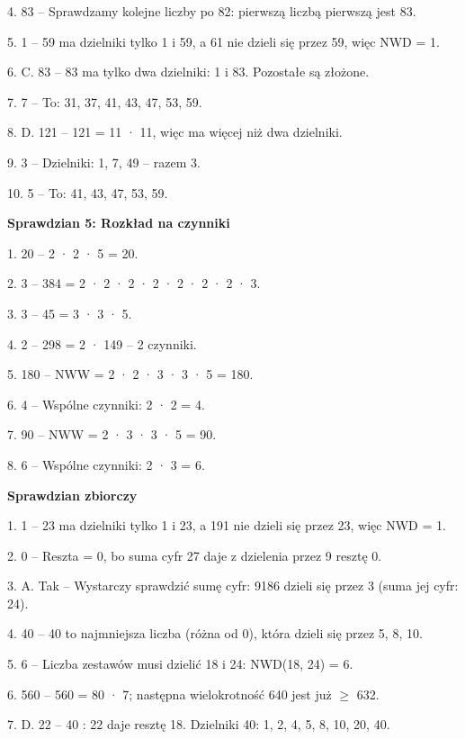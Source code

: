 4. 83 {\color{szary}– Sprawdzamy kolejne liczby po 82: pierwszą liczbą pierwszą jest 83.}\par
5. 1 {\color{szary}– 59 ma dzielniki tylko 1 i 59, a 61 nie dzieli się przez 59, więc NWD = 1.}\par
6. C. 83 {\color{szary}– 83 ma tylko dwa dzielniki: 1 i 83. Pozostałe są złożone.}\par
7. 7 {\color{szary}– To: 31, 37, 41, 43, 47, 53, 59.}\par
8. D. 121 {\color{szary}– 121 = 11 · 11, więc ma więcej niż dwa dzielniki.}\par
9. 3 {\color{szary}– Dzielniki: 1, 7, 49 – razem 3.}\par
10. 5 {\color{szary}– To: 41, 43, 47, 53, 59.}\par
\medskip
\textbf{\color{pomd}Sprawdzian 5: Rozkład na czynniki}\par
1. 20 {\color{szary}– 2 · 2 · 5 = 20.}\par
2. 3 {\color{szary}– 384 = 2 · 2 · 2 · 2 · 2 · 2 · 2 · 3.}\par
3. 3 {\color{szary}– 45 = 3 · 3 · 5.}\par
4. 2 {\color{szary}– 298 = 2 · 149 – 2 czynniki.}\par
5. 180 {\color{szary}– NWW = 2 · 2 · 3 · 3 · 5 = 180.}\par
6. 4 {\color{szary}– Wspólne czynniki: 2 · 2 = 4.}\par
7. 90 {\color{szary}– NWW = 2 · 3 · 3 · 5 = 90.}\par
8. 6 {\color{szary}– Wspólne czynniki: 2 · 3 = 6.}\par
\medskip
\textbf{\color{pomd}Sprawdzian zbiorczy}\par
1. 1 {\color{szary}– 23 ma dzielniki tylko 1 i 23, a 191 nie dzieli się przez 23, więc NWD = 1.}\par
2. 0 {\color{szary}– Reszta = 0, bo suma cyfr 27 daje z dzielenia przez 9 resztę 0.}\par
3. A. Tak {\color{szary}– Wystarczy sprawdzić sumę cyfr: 9186 dzieli się przez 3 (suma jej cyfr: 24).}\par
4. 40 {\color{szary}– 40 to najmniejsza liczba (różna od 0), która dzieli się przez 5, 8, 10.}\par
5. 6 {\color{szary}– Liczba zestawów musi dzielić 18 i 24: NWD(18, 24) = 6.}\par
6. 560 {\color{szary}– 560 = 80 · 7; następna wielokrotność 640 jest już $\geq$ 632.}\par
7. D. 22 {\color{szary}– 40 : 22 daje resztę 18. Dzielniki 40: 1, 2, 4, 5, 8, 10, 20, 40.}\par
